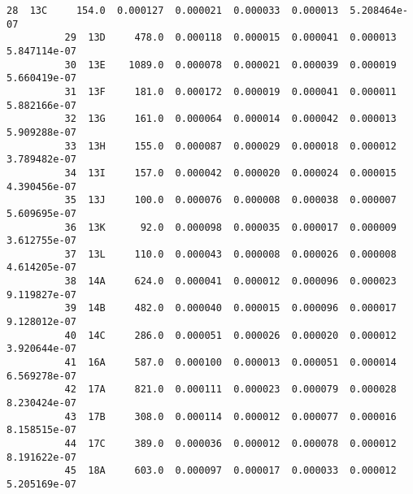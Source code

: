 \documentclass[11pt]{article}
\begin{document}
\begin{Verbatim}[commandchars=\\\{\}]
          28  13C     154.0  0.000127  0.000021  0.000033  0.000013  5.208464e-07   
          29  13D     478.0  0.000118  0.000015  0.000041  0.000013  5.847114e-07   
          30  13E    1089.0  0.000078  0.000021  0.000039  0.000019  5.660419e-07   
          31  13F     181.0  0.000172  0.000019  0.000041  0.000011  5.882166e-07   
          32  13G     161.0  0.000064  0.000014  0.000042  0.000013  5.909288e-07   
          33  13H     155.0  0.000087  0.000029  0.000018  0.000012  3.789482e-07   
          34  13I     157.0  0.000042  0.000020  0.000024  0.000015  4.390456e-07   
          35  13J     100.0  0.000076  0.000008  0.000038  0.000007  5.609695e-07   
          36  13K      92.0  0.000098  0.000035  0.000017  0.000009  3.612755e-07   
          37  13L     110.0  0.000043  0.000008  0.000026  0.000008  4.614205e-07   
          38  14A     624.0  0.000041  0.000012  0.000096  0.000023  9.119827e-07   
          39  14B     482.0  0.000040  0.000015  0.000096  0.000017  9.128012e-07   
          40  14C     286.0  0.000051  0.000026  0.000020  0.000012  3.920644e-07   
          41  16A     587.0  0.000100  0.000013  0.000051  0.000014  6.569278e-07   
          42  17A     821.0  0.000111  0.000023  0.000079  0.000028  8.230424e-07   
          43  17B     308.0  0.000114  0.000012  0.000077  0.000016  8.158515e-07   
          44  17C     389.0  0.000036  0.000012  0.000078  0.000012  8.191622e-07   
          45  18A     603.0  0.000097  0.000017  0.000033  0.000012  5.205169e-07   
          

\end{Verbatim}
\end{document}
